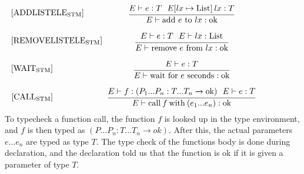 \begin{equation}\label{app:addlistelestmt}
\begin{minipage}{.2\linewidth}
$[\text{ADDLISTELE}_\text{STM}]$
\end{minipage}
\begin{minipage}{.8\linewidth}
\centering
$\cfrac{E \vdash e : T \: \: \: E[lx \mapsto \text{List}] \: lx : T} {E \vdash \text{add } e \text{ to } lx: \text{ok} }$
\end{minipage}
\end{equation}

\begin{equation}
\begin{minipage}{.2\linewidth}
$[\text{REMOVELISTELE}_\text{STM}]$
\end{minipage}
\begin{minipage}{.8\linewidth}
\centering
$\cfrac{E \vdash e : T \: \: \: E \vdash lx : \text{List}} {E \vdash \text{remove } e \text{ from } lx: \text{ok} }$
\end{minipage}
\end{equation}

\begin{equation}
\begin{minipage}{.2\linewidth}
$[\text{WAIT}_\text{STM}]$
\end{minipage}
\begin{minipage}{.8\linewidth}
\centering
$\cfrac{E \vdash e : T} {E \vdash \text{wait for } e \text{ seconds}: \text{ok} }$
\end{minipage}
\end{equation}

\begin{equation}
\begin{minipage}{.2\linewidth}
$[\text{CALL}_\text{STM}]$
\end{minipage}
\begin{minipage}{.8\linewidth}
\centering
$\cfrac{E \vdash f : (P_1...P_n : T...T_n \xrightarrow{}\text{ok}) \: \: \: E \vdash e : T}{E \vdash \text{call} \: f \: \text{with} \: (e_1...e_n) : \text{ok}}$
\end{minipage}
\end{equation}
To typecheck a function call, the function $f$ is looked up in the type environment, and $f$ is then typed as $(P...P_n : T...T_n \xrightarrow{} ok)$. After this, the actual parameters $e...e_n$ are typed as type $T$. The type check of the functions body is done during declaration, and the declaration told us that the function is ok if it is given a parameter of type $T$.

